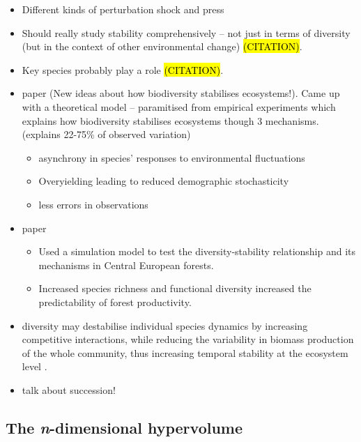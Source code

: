 \begin{itemize}
	\item Different kinds of perturbation shock and press \citep{Ives2007}
	\item Should really study stability comprehensively – not just in terms of diversity (but in the context of other environmental change) \hl{(CITATION)}. 
	\item Key species probably play a role \hl{(CITATION)}. 
	\item \cite{DeMazancourt2013} paper (New ideas about how biodiversity stabilises ecosystems!). Came up with a theoretical model – paramitised from empirical experiments which explains how biodiversity stabilises ecosystems though 3 mechanisms. (explains 22-75\% of observed variation) 
	\begin{itemize}
		\item asynchrony in species’ responses to environmental fluctuations
		\item Overyielding leading to reduced demographic stochasticity 
		\item less errors in observations
	\end{itemize}
	\item \cite{Morin2014} paper
		\begin{itemize}
			\item Used a simulation model to test the diversity-stability relationship and its mechanisms in Central European forests. 
			\item Increased species richness and functional diversity increased the predictability of forest productivity. 
		\end{itemize}
	\item diversity may destabilise individual species dynamics by increasing competitive interactions, while reducing the variability in biomass production of the whole community, thus increasing temporal stability at the ecosystem level \citep{Tilman2006, Proulx2010}.
	\item talk about succession!
\end{itemize}




\subsection{The \emph{n}-dimensional hypervolume}

